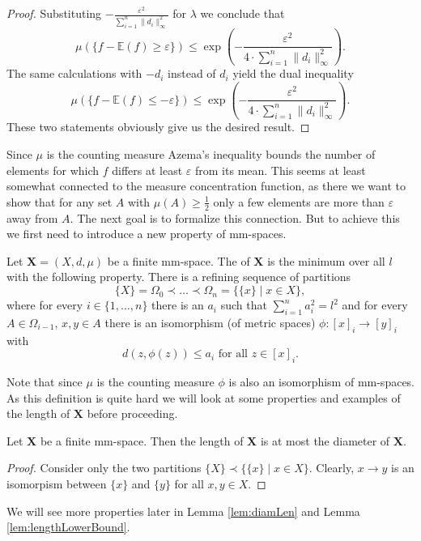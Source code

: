 \begin{proof}
Substituting $-\frac{\varepsilon^2}{\sum_{i=1}^{n}\|d_i\|_\infty^2}$ for $\lambda$ we conclude that
\[\mu(\{f-\mathbb{E}(f)\geq \varepsilon\})\leq\exp\left(-\frac{\varepsilon^2}{4\cdot\sum_{i=1}^{n}\|d_i\|^2_\infty}\right). \]
The same calculations with $-d_i$ instead of $d_i$ yield the dual inequality
\[\mu(\{f-\mathbb{E}(f)\leq -\varepsilon\})\leq\exp\left(-\frac{\varepsilon^2}{4\cdot\sum_{i=1}^{n}\|d_i\|^2_\infty}\right). \]
These two statements obviously give us the desired result.
\end{proof}

Since $\mu$ is the counting measure Azema's inequality bounds the number of elements for which $f$ differs at least $\varepsilon$ from its mean. This seems at least somewhat connected to the measure concentration function, as there we want to show that for any set $A$ with $\mu(A)\geq\frac{1}{2}$ only a few elements are more than $\varepsilon$ away from $A$.
The next goal is to formalize this connection. %
But to achieve this we first need to introduce a new property of mm-spaces.
\begin{definition}\label{def:length}
Let $\boldsymbol{X}=(X,d,\mu)$ be a finite mm-space. The  of $\boldsymbol X$ is the minimum over all $l$ with the following property. There is a refining sequence of partitions 
\[\{X\}=\Omega_0\prec\dots\prec\Omega_n=\{\{x\}\mid x\in X\},\]
where for every $i\in\{1,\dots,n\}$ there is an $a_i$ such that $\sum_{i=1}^{n}a^2_i=l^2$ and for every $A\in \Omega_{i-1}$, $x,y\in A$ there is an isomorphism (of metric spaces) $\phi\colon[x]_i\to [y]_i$ with 
\[d(z,\phi(z))\leq a_i\text{ for all $z\in[x]_i$.}\]
\end{definition}

Note that since $\mu$ is the counting measure $\phi$ is also an isomorphism of mm-spaces.
As this definition is quite hard we will look at some properties and examples of the length of $\boldsymbol{X}$ before proceeding.
\begin{lemma}
Let $\boldsymbol{X}$ be a finite mm-space. Then the length of $\boldsymbol{X}$ is at most the diameter of $\boldsymbol{X}$.
\end{lemma}
\begin{proof}
Consider only the two partitions $\{X\}\prec\{\{x\}\mid x\in X\}$. Clearly,  $x\to y$ is an isomorpism between $\{x\}$ and $\{y\}$ for all $x,y\in X$.
\end{proof}

We will see more properties later in Lemma \ref{lem:diamLen} and Lemma \ref{lem:lengthLowerBound}.

